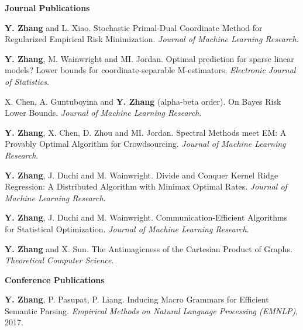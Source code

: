 \documentclass{res} %
\begin{document}
\begin{resume}
{\bf\Large Journal Publications}
\vspace{5pt}

\begin{enumerate}[label={[J\arabic*]}, ref={J\arabic*}]

\item \textbf{Y. Zhang} and L. Xiao. Stochastic Primal-Dual Coordinate Method for Regularized Empirical Risk Minimization.
\emph{Journal of Machine Learning Research}.\label{stochastic-jmlr}

\item \textbf{Y. Zhang}, M. Wainwright and MI. Jordan. Optimal prediction for sparse linear models? Lower bounds for coordinate-separable M-estimators.\label{optimality-ejs}
\emph{Electronic Journal of Statistics}.

\item X. Chen, A. Guntuboyina and \textbf{Y. Zhang} (alpha-beta order). On Bayes Risk Lower Bounds.
\emph{Journal of Machine Learning Research}.\label{on-bayes-jmlr}

\item \textbf{Y. Zhang}, X. Chen, D. Zhou and MI. Jordan. Spectral Methods meet EM: A Provably Optimal Algorithm for Crowdsourcing.
\emph{Journal of Machine Learning Research}.\label{spectral-jmlr}

\item \textbf{Y. Zhang}, J. Duchi and M. Wainwright. Divide and Conquer Kernel Ridge Regression: A Distributed Algorithm with Minimax Optimal Rates.
\emph{Journal of Machine Learning Research}.\label{divide-jmlr}

\item \textbf{Y. Zhang}, J. Duchi and M. Wainwright. Communication-Efficient Algorithms for Statistical Optimization.
\emph{Journal of Machine Learning Research}.\label{communication-jmlr}

\item \textbf{Y. Zhang} and X. Sun. The Antimagicness of the Cartesian Product of Graphs.
\emph{Theoretical Computer Science}.\label{the-antimagicness-tcs}
\end{enumerate}

{\bf\Large Conference Publications}
\vspace{5pt}

\begin{enumerate}[label={[C\arabic*]}, ref={C\arabic*}]

\item  \textbf{Y. Zhang}, P. Pasupat, P. Liang. Inducing Macro Grammars for Efficient Semantic Parsing.
\emph{Empirical Methods on Natural Language Processing (EMNLP)}, 2017. \label{macro-emnlp17}


\end{enumerate}
\end{resume}
\end{document}
